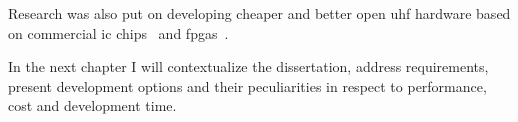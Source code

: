 Research was also put on developing cheaper and better open \ac{uhf} hardware based on commercial \ac{ic} chips~\cite{tangDesignUHFRFID2010a, leiDesignHandheldUHF2011, wangHardwareDesignImplementation2015} and \acp{fpga}~\cite{mirandaSistemasRFIDUHF2015}.

In the next chapter I will contextualize the dissertation, address requirements, present development options and their peculiarities in respect to performance, cost and development time.

\cleardoublepage